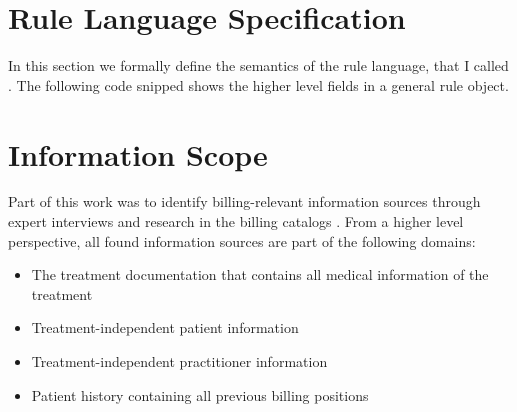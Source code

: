 \section{Rule Language Specification}\label{sec:rule-language-specification}

In this section we formally define the semantics of the rule language, that I called \RL.
The following code snipped \addref shows the higher level fields in a general rule object.



\section{Information Scope}\label{sec:information-scope}
Part of this work was
to identify billing-relevant information sources through expert interviews and research in the billing catalogs \addcite.
From a higher level perspective, all found information sources are part of the following domains:
\begin{itemize}
    \item The treatment documentation that contains all medical information of the treatment
    \item Treatment-independent patient information
    \item Treatment-independent practitioner information
    \item Patient history containing all previous billing positions
\end{itemize}







